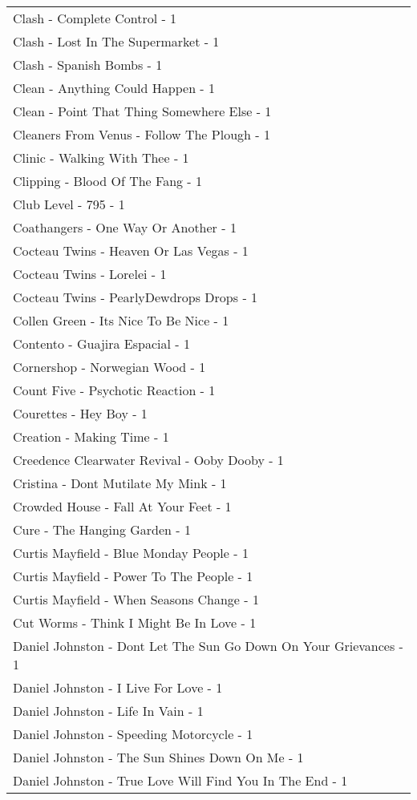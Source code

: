 \documentclass[
]{article}
\begin{document}
\begin{longtable}{l}
Clash - Complete Control - 1 \\ 
Clash - Lost In The Supermarket - 1 \\ 
Clash - Spanish Bombs - 1 \\ 
Clean - Anything Could Happen - 1 \\ 
Clean - Point That Thing Somewhere Else - 1 \\ 
Cleaners From Venus - Follow The Plough - 1 \\ 
Clinic - Walking With Thee - 1 \\ 
Clipping - Blood Of The Fang - 1 \\ 
Club Level - 795 - 1 \\ 
Coathangers - One Way Or Another - 1 \\ 
Cocteau Twins - Heaven Or Las Vegas - 1 \\ 
Cocteau Twins - Lorelei - 1 \\ 
Cocteau Twins - PearlyDewdrops Drops - 1 \\ 
Collen Green - Its Nice To Be Nice - 1 \\ 
Contento - Guajira Espacial - 1 \\ 
Cornershop - Norwegian Wood - 1 \\ 
Count Five - Psychotic Reaction - 1 \\ 
Courettes - Hey Boy - 1 \\ 
Creation - Making Time - 1 \\ 
Creedence Clearwater Revival - Ooby Dooby - 1 \\ 
Cristina - Dont Mutilate My Mink - 1 \\ 
Crowded House - Fall At Your Feet - 1 \\ 
Cure - The Hanging Garden - 1 \\ 
Curtis Mayfield - Blue Monday People - 1 \\ 
Curtis Mayfield - Power To The People - 1 \\ 
Curtis Mayfield - When Seasons Change - 1 \\ 
Cut Worms - Think I Might Be In Love - 1 \\ 
Daniel Johnston - Dont Let The Sun Go Down On Your Grievances - 1 \\ 
Daniel Johnston - I Live For Love - 1 \\ 
Daniel Johnston - Life In Vain - 1 \\ 
Daniel Johnston - Speeding Motorcycle - 1 \\ 
Daniel Johnston - The Sun Shines Down On Me - 1 \\ 
Daniel Johnston - True Love Will Find You In The End - 1 \\ 

\end{longtable}
\end{document}

